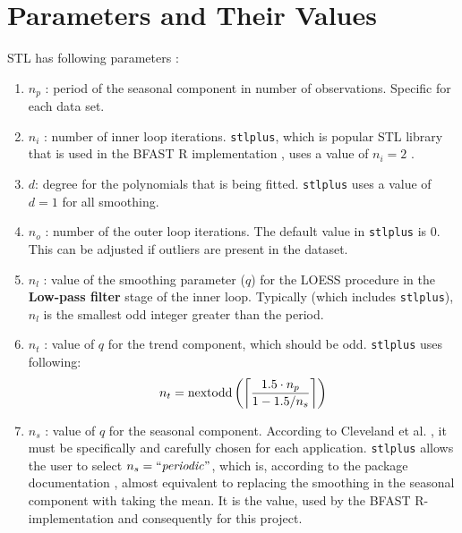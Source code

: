 \documentclass[main.tex]{subfiles}
\begin{document}
\section{Parameters and Their Values}
\label{sec:parameter_values}
STL has following parameters \cite{stl}:
\begin{enumerate}
\item $n_p$ : period of the seasonal component in number of observations.
  Specific for each data set.
\item $n_i$ : number of inner loop iterations. \texttt{stlplus}, which is
  popular STL library that is used in the BFAST R implementation \cite{bfast-github}, uses a
  value of $n_i = 2$ \cite{stlplus}.
\item $d$: degree for the polynomials that is being fitted.
  \texttt{stlplus} uses a value of $d=1$ for all smoothing.
\item $n_o$ : number of the outer loop iterations. The default value in
  \texttt{stlplus} is 0. This can be adjusted if outliers are present in the dataset.
\item $n_l$ : value of the smoothing parameter ($q$) for the LOESS procedure in the
  \textbf{Low-pass filter} stage of the inner loop. Typically (which includes
  \texttt{stlplus}), $n_l$ is the smallest odd integer greater than the period.
\item $n_t$ : value of $q$ for the trend component, which should be odd.
  \texttt{stlplus} uses following:
  \[
  n_t =\text{nextodd}\left(
  \ceil[\bigg]{
    \frac{1.5 \cdot n_p}
         {1-1.5/n_s}
  }
  \right)
  \]
\item $n_s$ : value of $q$ for the seasonal component. According to Cleveland
  et al. \cite{stl}, it must be specifically and
  carefully chosen for each application. \texttt{stlplus} allows
  the user to select $n_s = \text{``\emph{periodic}''}$, which is, according to
  the package documentation \cite{stlplus}, almost equivalent to replacing
  the smoothing in the seasonal component with taking the mean. It is the value,
  used by the BFAST R-implementation and consequently for this project.
\end{enumerate}
\biblio
\end{document}
